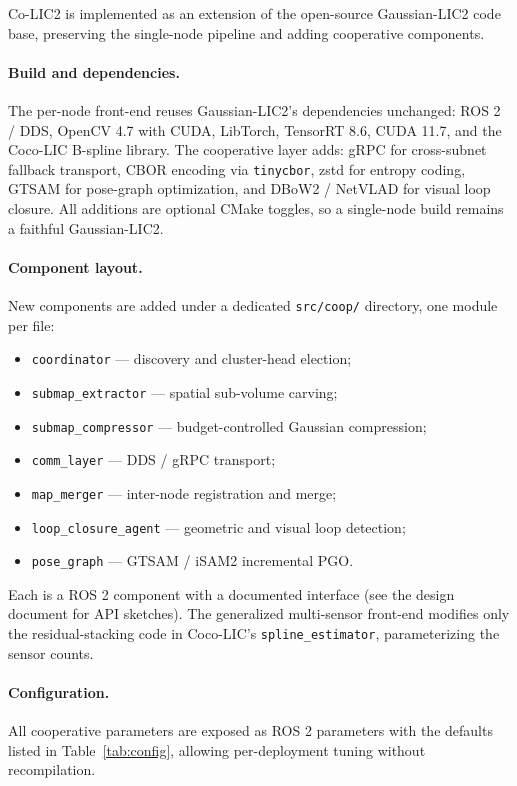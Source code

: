 \label{sec:implementation}

Co-LIC2 is implemented as an extension of the open-source Gaussian-LIC2 code
base, preserving the single-node pipeline and adding cooperative components.

\paragraph{Build and dependencies.} The per-node front-end reuses
Gaussian-LIC2's dependencies unchanged: ROS 2 / DDS, OpenCV 4.7 with CUDA,
LibTorch, TensorRT 8.6, CUDA 11.7, and the Coco-LIC B-spline library. The
cooperative layer adds: gRPC for cross-subnet fallback transport, CBOR
encoding via \texttt{tinycbor}, zstd for entropy coding, GTSAM for pose-graph
optimization, and DBoW2 / NetVLAD for visual loop closure. All additions are
optional CMake toggles, so a single-node build remains a faithful
Gaussian-LIC2.

\paragraph{Component layout.} New components are added under a dedicated
\texttt{src/coop/} directory, one module per file:
\begin{itemize}
  \item \texttt{coordinator} --- discovery and cluster-head election;
  \item \texttt{submap\_extractor} --- spatial sub-volume carving;
  \item \texttt{submap\_compressor} --- budget-controlled Gaussian compression;
  \item \texttt{comm\_layer} --- DDS / gRPC transport;
  \item \texttt{map\_merger} --- inter-node registration and merge;
  \item \texttt{loop\_closure\_agent} --- geometric and visual loop detection;
  \item \texttt{pose\_graph} --- GTSAM / iSAM2 incremental PGO.
\end{itemize} Each is a ROS 2 component with a documented interface
(see the design document for API sketches). The generalized multi-sensor
front-end modifies only the residual-stacking code in Coco-LIC's
\texttt{spline\_estimator}, parameterizing the sensor counts.

\paragraph{Configuration.} All cooperative parameters are exposed as ROS 2
parameters with the defaults listed in Table~\ref{tab:config}, allowing
per-deployment tuning without recompilation.

